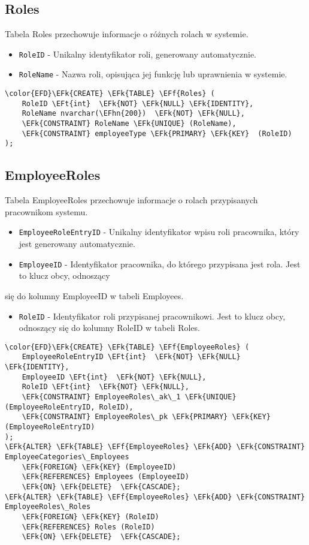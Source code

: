 \documentclass[11pt]{article}
\newcommand{\EFk}[1]{\textcolor{EFk}{\textbf{#1}}} %
\newcommand{\EFf}[1]{\textcolor{EFf}{#1}} %
\newcommand{\EFt}[1]{\textcolor{EFt}{\textbf{#1}}} %
\newcommand{\EFhn}[1]{\textcolor{EFhn}{#1}} %
\begin{document}
\subsection{Roles}
\label{sec:org0611d1a}
Tabela Roles przechowuje informacje o różnych rolach w systemie.
\begin{itemize}
\item \texttt{RoleID} - Unikalny identyfikator roli, generowany automatycznie.
\item \texttt{RoleName} - Nazwa roli, opisująca jej funkcję lub uprawnienia w systemie.
\end{itemize}
\begin{Code}
\begin{Verbatim}
\color{EFD}\EFk{CREATE} \EFk{TABLE} \EFf{Roles} (
    RoleID \EFt{int}  \EFk{NOT} \EFk{NULL} \EFk{IDENTITY},
    RoleName nvarchar(\EFhn{200})  \EFk{NOT} \EFk{NULL},
    \EFk{CONSTRAINT} RoleName \EFk{UNIQUE} (RoleName),
    \EFk{CONSTRAINT} employeeType \EFk{PRIMARY} \EFk{KEY}  (RoleID)
);
\end{Verbatim}
\end{Code}
\subsection{EmployeeRoles}
\label{sec:org8fd644d}
Tabela EmployeeRoles przechowuje informacje o rolach przypisanych pracownikom systemu.
\begin{itemize}
\item \texttt{EmployeeRoleEntryID} - Unikalny identyfikator wpisu roli pracownika, który jest generowany automatycznie.
\item \texttt{EmployeeID} - Identyfikator pracownika, do którego przypisana jest rola. Jest to klucz obcy, odnoszący
\end{itemize}
się do kolumny EmployeeID w tabeli Employees.
\begin{itemize}
\item \texttt{RoleID} - Identyfikator roli przypisanej pracownikowi. Jest to klucz obcy, odnoszący się do kolumny RoleID w tabeli Roles.
\end{itemize}

\begin{Code}
\begin{Verbatim}
\color{EFD}\EFk{CREATE} \EFk{TABLE} \EFf{EmployeeRoles} (
    EmployeeRoleEntryID \EFt{int}  \EFk{NOT} \EFk{NULL} \EFk{IDENTITY},
    EmployeeID \EFt{int}  \EFk{NOT} \EFk{NULL},
    RoleID \EFt{int}  \EFk{NOT} \EFk{NULL},
    \EFk{CONSTRAINT} EmployeeRoles\_ak\_1 \EFk{UNIQUE} (EmployeeRoleEntryID, RoleID),
    \EFk{CONSTRAINT} EmployeeRoles\_pk \EFk{PRIMARY} \EFk{KEY}  (EmployeeRoleEntryID)
);
\EFk{ALTER} \EFk{TABLE} \EFf{EmployeeRoles} \EFk{ADD} \EFk{CONSTRAINT} EmployeeCategories\_Employees
    \EFk{FOREIGN} \EFk{KEY} (EmployeeID)
    \EFk{REFERENCES} Employees (EmployeeID)
    \EFk{ON} \EFk{DELETE}  \EFk{CASCADE};
\EFk{ALTER} \EFk{TABLE} \EFf{EmployeeRoles} \EFk{ADD} \EFk{CONSTRAINT} EmployeeRoles\_Roles
    \EFk{FOREIGN} \EFk{KEY} (RoleID)
    \EFk{REFERENCES} Roles (RoleID)
    \EFk{ON} \EFk{DELETE}  \EFk{CASCADE};
\end{Verbatim}
\end{Code}
\end{document}
